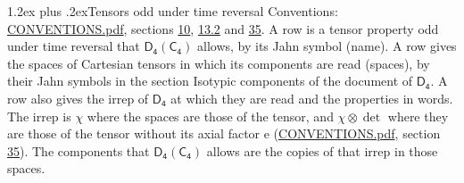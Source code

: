 \documentclass[10pt,a4paper]{article}
\makeatletter
\renewcommand\section{\@startsection{section}{1}{\z@}{-3ex plus -1ex minus -.2ex}%
  {1.2ex plus .2ex}{\normalfont\large\sffamily\bfseries\color{parttitle}}}
\numberwithin{equation}{section}
\newcommand{\grp}[1]{\mathsf{#1}}
\newcommand{\irrprod}{\otimes}
\makeatother
\begin{document}
\section{Tensors odd under time reversal}\label{s:time_odd}
Conventions: \href{../../CONVENTIONS.pdf}{CONVENTIONS.pdf}, sections \href{../../../rotation/CONVENTIONS.pdf\#conv.10}{10}, \href{../../../rotation/CONVENTIONS.pdf\#conv.13.2}{13.2} and \href{../../CONVENTIONS.pdf\#conv.35}{35}.
\leavevmode\label{n:head.name.property}A row is a tensor property odd under time reversal that $\grp{D_{4}}(\grp{C_{4}})$ allows, by its Jahn symbol (name). \label{n:head.spaces}A row gives the spaces of Cartesian tensors in which its components are read (spaces), by their Jahn symbols in the section Isotypic components of the document of \href{../../../rotation/data/pdf/D4.pdf}{$\grp{D_{4}}$}. \label{n:head.properties}A row also gives the irrep of $\grp{D_{4}}$ at which they are read and the properties in words. The irrep is $\chi$ where the spaces are those of the tensor, and $\chi \irrprod \det$ where they are those of the tensor without its axial factor e (\href{../../CONVENTIONS.pdf}{CONVENTIONS.pdf}, section \href{../../CONVENTIONS.pdf\#conv.35}{35}). The components that $\grp{D_{4}}(\grp{C_{4}})$ allows are the copies of that irrep in those spaces.
\end{document}
